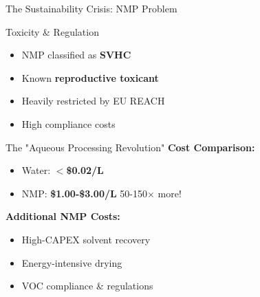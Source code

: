 \documentclass[aspectratio=169]{beamer}
\begin{document}
\begin{frame}{The Sustainability Crisis: NMP Problem}
    \begin{alertblock}{Toxicity \& Regulation}
        \small
        \begin{itemize}
            \item NMP classified as \textbf{SVHC}
            \item Known \textbf{reproductive toxicant}
            \item Heavily restricted by EU REACH
            \item High compliance costs
        \end{itemize}
    \end{alertblock}
    
    \vspace{-0.15cm}
    \begin{block}{The "Aqueous Processing Revolution"}
        \small \textbf{Cost Comparison:}
        \begin{itemize}\small
            \item Water: \textbf{$<$\$0.02/L}
            \item NMP: \textbf{\$1.00-\$3.00/L} \quad \textcolor{AlertRed}{50-150$\times$ more!}
        \end{itemize}
        
        \vspace{0.1cm}
        \textbf{Additional NMP Costs:}
        \begin{itemize}\small
            \item High-CAPEX solvent recovery
            \item Energy-intensive drying
            \item VOC compliance \& regulations
        \end{itemize}
    \end{block}
\end{frame}
\end{document}
